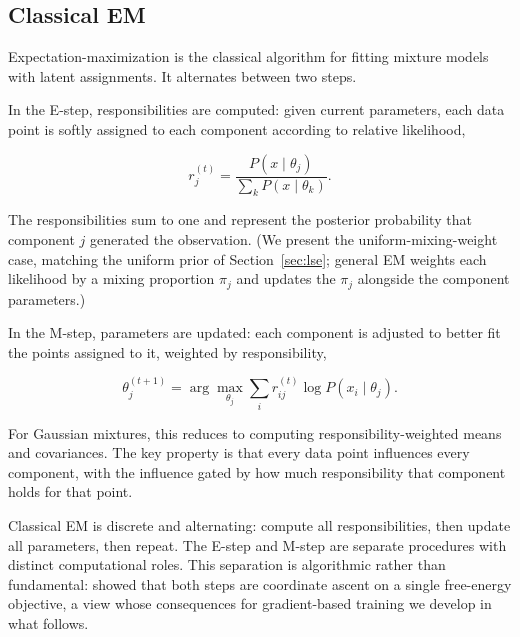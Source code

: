 \subsection{Classical EM}

Expectation-maximization is the classical algorithm for fitting mixture models with latent assignments. It alternates between two steps.

In the E-step, responsibilities are computed: given current parameters, each data point is softly assigned to each component according to relative likelihood,

\[
r_j^{(t)} = \frac{P(x \mid \theta_j)}{\sum_k P(x \mid \theta_k)}.
\]

The responsibilities sum to one and represent the posterior probability that component $j$ generated the observation. (We present the uniform-mixing-weight case, matching the uniform prior of Section~\ref{sec:lse}; general EM weights each likelihood by a mixing proportion $\pi_j$ and updates the $\pi_j$ alongside the component parameters.)

In the M-step, parameters are updated: each component is adjusted to better fit the points assigned to it, weighted by responsibility,

\[
\theta_j^{(t+1)} = \arg\max_{\theta_j} \sum_i r_{ij}^{(t)} \log P(x_i \mid \theta_j).
\]

For Gaussian mixtures, this reduces to computing responsibility-weighted means and covariances. The key property is that every data point influences every component, with the influence gated by how much responsibility that component holds for that point.

Classical EM is discrete and alternating: compute all responsibilities, then update all parameters, then repeat. The E-step and M-step are separate procedures with distinct computational roles. This separation is algorithmic rather than fundamental: \citet{neal1998view} showed that both steps are coordinate ascent on a single free-energy objective, a view whose consequences for gradient-based training we develop in what follows.
